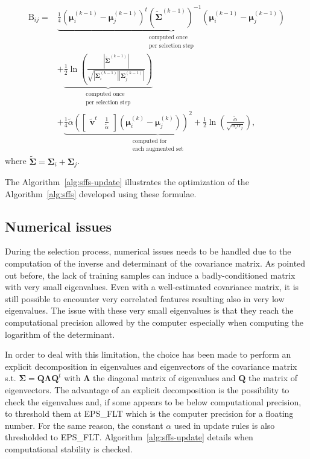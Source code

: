 \documentclass[journal,peerreview,onecolumn]{IEEEtran}
\begin{document}
        \begin{align}
        \label{eq:jm-update}
            \text{B}_{ij} = &\underbrace{\frac{1}{4} (\boldsymbol{\mu}_i^{(k-1)} - \boldsymbol{\mu}_j^{(k-1)})^t ( \boldsymbol{\tilde{\Sigma}}^{(k-1)} )^{-1} (\boldsymbol{\mu}_i^{(k-1)} - \boldsymbol{\mu}_j^{(k-1)})}_{\substack{\text{computed once}\\ \text{per selection step}}} \nonumber \\
            &+ \underbrace{\frac{1}{2} \ln \left( \frac{|\boldsymbol{\tilde{\Sigma}}^{(k-1)}|}{\sqrt{|\boldsymbol{\Sigma}_i^{(k-1)}| |\boldsymbol{\Sigma}_j^{(k-1)}|}} \right)}_{\substack{\text{computed once}\\ \text{per selection step}}} \nonumber \\
            &+ \underbrace{\frac{1}{4} \tilde{\alpha} ( \left[\begin{array}{cc} \mathbf{\tilde{v}}^t & \frac{1}{\tilde{\alpha}} \end{array}\right] (\boldsymbol{\mu}_{i}^{(k)} - \boldsymbol{\mu}_{j}^{(k)}) )^2 + \frac{1}{2} \ln \left( \frac{\tilde{\alpha}}{\sqrt{\alpha_i \alpha_j}} \right)}_{\substack{\text{computed for} \\ \text{each augmented set}}},
        \end{align}
        where $\boldsymbol{\tilde{\Sigma}} = \boldsymbol{\Sigma}_i + \boldsymbol{\Sigma}_j$.

        The Algorithm~\ref{alg:sffs-update} illustrates the optimization of the Algorithm~\ref{alg:sffs} developed using these formulae.

    \subsection{Numerical issues}

    During the selection process, numerical issues needs to be handled due to the computation of the inverse and determinant of the covariance matrix. As pointed out before, the lack of training samples can induce a badly-conditioned matrix with very small eigenvalues. Even with a well-estimated covariance matrix, it is still possible to encounter very correlated features resulting also in very low eigenvalues. The issue with these very small eigenvalues is that they reach the computational precision allowed by the computer especially when computing the logarithm of the determinant.

    In order to deal with this limitation, the choice has been made to perform an explicit decomposition in eigenvalues and eigenvectors of the covariance matrix s.t. $\boldsymbol{\Sigma} = \mathbf{Q} \boldsymbol{\Lambda} \mathbf{Q}^t$ with $\boldsymbol{\Lambda}$ the diagonal matrix of eigenvalues and $\mathbf{Q}$ the matrix of eigenvectors. The advantage of an explicit decomposition is the possibility to check the eigenvalues and, if some appears to be below computational precision, to threshold them at EPS\_FLT which is the computer precision for a floating number. For the same reason, the constant $\alpha$ used in update rules is also thresholded to EPS\_FLT. Algorithm~\ref{alg:sffs-update} details when computational stability is checked.
\end{document}
